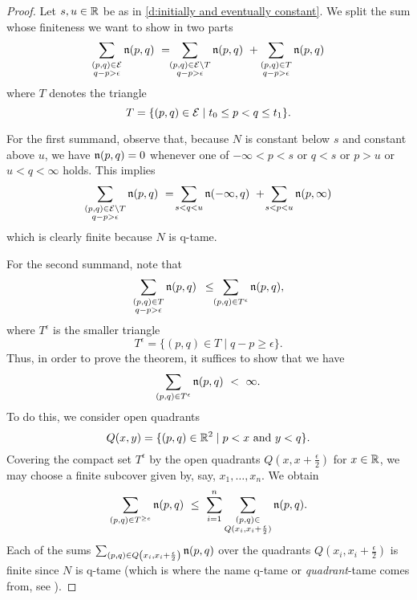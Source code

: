 \begin{proof}
	Let $s, u \in \mathbb{R}$ be as in \cref{d:initially and eventually constant}.
	We split the sum whose finiteness we want to show in two parts
	\begin{equation*}
	\sum_{ \substack{ (p,q) \in \mathcal{E} \\ q-p > \epsilon } } \mathfrak{n} (p,q) \ = \!\!
	\sum_{ \substack{ (p,q) \in \mathcal{E} \setminus T \\ q-p > \epsilon } } \mathfrak{n} (p,q) \ +
	\sum_{ \substack{ (p,q) \in T \\ q-p > \epsilon } } \mathfrak{n} (p,q)
	\end{equation*}
	where $T$ denotes the triangle
	\begin{equation*}
	T = \{(p,q) \in \mathcal{E} \mid t_0 \leq p < q \leq t_1\}.
	\end{equation*}

	For the first summand, observe that, because $N$ is constant below $s$ and constant above $u$, we have $\mathfrak{n}(p,q) = 0$ whenever one of $-\infty < p < s$ or $q < s$ or $p > u$ or $u < q < \infty$ holds.
	This implies
	\begin{equation*}
	\sum_{ \substack{ (p,q) \in \mathcal{E} \setminus T \\ q-p > \epsilon } } \mathfrak{n} (p,q)
	\ = \!
	\sum_{s < q < u} \mathfrak{n} (-\infty,q)
	\ + \!
	\sum_{s < p < u} \mathfrak{n} (p, \infty)
	\end{equation*}
	which is clearly finite because $N$ is q-tame.

	For the second summand, note that
	\begin{equation*}
	\sum_{ \substack{ (p,q) \in T \\ q-p > \epsilon } } \mathfrak{n} (p,q)
	\ \, \leq \!\!
	\sum_{(p,q) \in T^{\epsilon}} \mathfrak{n} (p,q),
	\end{equation*}
	where $T^{\epsilon}$ is the smaller triangle
	\begin{equation*}
	T^{\epsilon} = \{(p,q) \in T \mid q-p \geq \epsilon\}.
	\end{equation*}
	Thus, in order to prove the theorem, it suffices to show that we have
	\begin{equation*}
	\sum_{(p,q) \in T^{\epsilon}} \mathfrak{n} (p,q)
	\ < \
	\infty.
	\end{equation*}
	To do this, we consider open quadrants
	\begin{equation*}
	Q(x, y) = \{ (p, q) \in \mathbb{R}^2 \mid p < x \text{ and } y < q \}.
	\end{equation*}
	Covering the compact set $T^{\epsilon}$ by the open quadrants $Q \left(x, x + \frac{\epsilon}{2} \right)$ for $x \in \mathbb{R}$, we may choose a finite subcover given by, say, $x_1,\dots, x_n$.
	We obtain
	\begin{equation*}
	\sum_{(p,q) \in T^{\geq e}} \mathfrak{n} (p,q)
	\ \leq \
	\sum_{i=1}^n \sum_{\substack{(p, q) \in \\ Q (x_i, x_i + \frac{\epsilon}{2})}} \mathfrak{n}(p,q).
	\end{equation*}
	Each of the sums $\sum_{(p,q) \in Q \left(x_i, x_i + \frac{\epsilon}{2} \right)} \mathfrak{n}(p,q)$ over the quadrants $Q \left(x_i, x_i + \frac{\epsilon}{2} \right)$ is finite since $N$ is q-tame (which is where the name q-tame or \emph{quadrant}-tame comes from, see \cite[Section 3.8]{Chazal.2016a}).
\end{proof}

